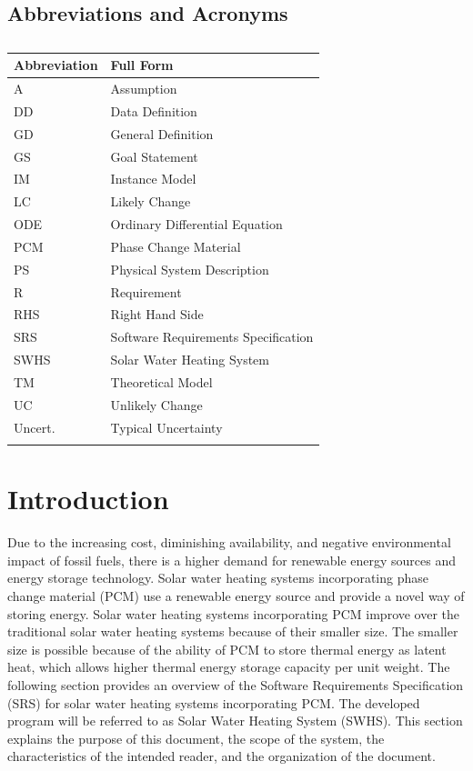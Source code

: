 \documentclass[12pt]{article}
\begin{document}
\subsection{Abbreviations and Acronyms}
\label{Sec:TAbbAcc}
\begin{longtable}{l l}
\toprule
Abbreviation & Full Form
\\
\midrule
\endhead
A & Assumption
\\
DD & Data Definition
\\
GD & General Definition
\\
GS & Goal Statement
\\
IM & Instance Model
\\
LC & Likely Change
\\
ODE & Ordinary Differential Equation
\\
PCM & Phase Change Material
\\
PS & Physical System Description
\\
R & Requirement
\\
RHS & Right Hand Side
\\
SRS & Software Requirements Specification
\\
SWHS & Solar Water Heating System
\\
TM & Theoretical Model
\\
UC & Unlikely Change
\\
Uncert. & Typical Uncertainty
\\
\bottomrule
\caption{}
\label{Table:TAbbAcc}
\end{longtable}
\section{Introduction}
\label{Sec:Intro}
Due to the increasing cost, diminishing availability, and negative environmental impact of fossil fuels, there is a higher demand for renewable energy sources and energy storage technology. Solar water heating systems incorporating phase change material (PCM) use a renewable energy source and provide a novel way of storing energy. Solar water heating systems incorporating PCM improve over the traditional solar water heating systems because of their smaller size. The smaller size is possible because of the ability of PCM to store thermal energy as latent heat, which allows higher thermal energy storage capacity per unit weight.
The following section provides an overview of the Software Requirements Specification (SRS) for solar water heating systems incorporating PCM. The developed program will be referred to as Solar Water Heating System (SWHS). This section explains the purpose of this document, the scope of the system, the characteristics of the intended reader, and the organization of the document.
\end{document}
